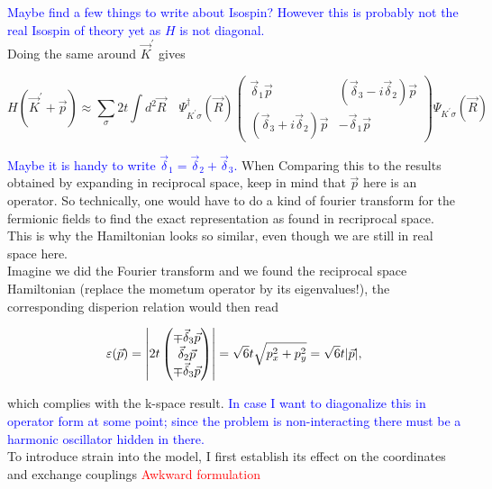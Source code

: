 \documentclass[../../../main.tex]{subfiles}
\begin{document}
\textcolor{blue}{Maybe find a few things to write about Isospin? However this is probably not the real Isospin of theory yet as $H$ is not diagonal.} \\

Doing the same around $\vec{K}^\prime$ gives 

\begin{equation}
	H(\vec{K}^\prime+\vec{p}) \approx \sum_\sigma 2t \int d^2\vec{R} \quad 
	\Psi^\dagger_{K^\prime\sigma} (\vec{R})
	\begin{pmatrix}
		\vec{\delta}_1\vec{p} & \left(\vec{\delta}_3-i\vec{\delta}_2\right)\vec{p} \\
		\left(\vec{\delta}_3 +i \vec{\delta}_2\right)\vec{p} & -\vec{\delta}_1\vec{p}
	\end{pmatrix}
	\Psi_{K^\prime\sigma}(\vec{R})
\end{equation}

\textcolor{blue}{Maybe it is handy to write $\vec{\delta}_1 = \vec{\delta}_2 + \vec{\delta}_3$.} When Comparing this to the results obtained by expanding in reciprocal space, keep in mind that $\vec{p}$ here is an operator. So technically, one would have to do a kind of fourier transform for the fermionic fields to find the exact representation as found in recriprocal space. This is why the Hamiltonian looks so similar, even though we are still in real space here. \\

Imagine we did the Fourier transform and we found the reciprocal space Hamiltonian (replace the mometum operator by its eigenvalues!), the corresponding disperion relation would then read

\begin{equation}
	\varepsilon(\vec{p}) = \abs{2t
		\begin{pmatrix}
			\mp \vec{\delta}_3\vec{p} \\
			\vec{\delta}_2\vec{p} \\
			\mp \vec{\delta}_3\vec{p}
		\end{pmatrix} } = \sqrt{6}t\sqrt{p_x^2 + p_y^2} = \sqrt{6}t\abs{\vec{p}},
\end{equation}

which complies with the k-space result. \textcolor{blue}{In case I want to diagonalize this in operator form at some point; since the problem is non-interacting there must be a harmonic oscillator hidden in there.} \\

To introduce strain into the model, I first establish its effect on the coordinates and exchange couplings \textcolor{red}{Awkward formulation}
\end{document}
